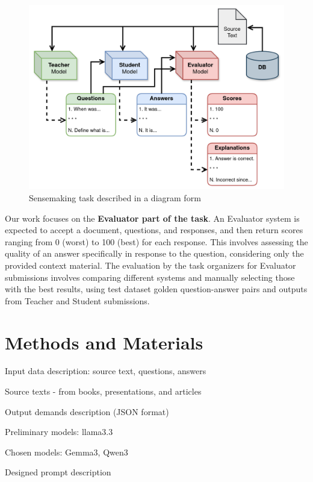 \documentclass[fleqn,10pt]{olplainarticle}
\begin{document}
\begin{figure}[h]
\centering
\includegraphics[width=0.9\linewidth]{task.png}
\caption{Sensemaking task described in a diagram form}
\label{fig:task-diagram}
\end{figure}

Our work focuses on the \textbf{Evaluator part of the task}. An Evaluator system is expected to accept a document, questions, and responses, and then return scores ranging from 0 (worst) to 100 (best) for each response. This involves assessing the quality of an answer specifically in response to the question, considering only the provided context material. The evaluation by the task organizers for Evaluator submissions involves comparing different systems and manually selecting those with the best results, using test dataset golden question-answer pairs and outputs from Teacher and Student submissions.

\section*{Methods and Materials}



Input data description: source text, questions, answers

Source texts - from books, presentations, and articles

Output demands description (JSON format)

Preliminary models: llama3.3

Chosen models: Gemma3, Qwen3

Designed prompt description
\end{document}
